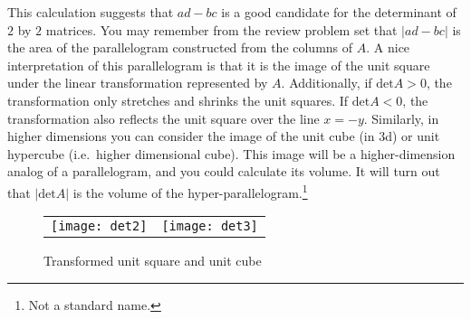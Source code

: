 \documentclass[12pt,reqno]{amsart}
\renewcommand{\det}{\mathrm{det}}
\theoremstyle{definition}
\begin{document}
This calculation suggests that $ad - bc $ is a good candidate for the
determinant of $2$ by $2$ matrices. You may remember from the review
problem set that $|ad-bc|$ is the area of the parallelogram
constructed from the columns of $A$. A nice interpretation of this
parallelogram is that it is the image of the unit square under the
linear transformation represented by $A$. Additionally, if $\det A >
0$, the transformation only stretches and shrinks the unit squares. If
$\det A<0$, the transformation also reflects the unit square over the
line $x = -y$. Similarly, in higher dimensions you can consider the
image of the unit cube (in 3d) or unit hypercube (i.e.\ higher
dimensional cube). This image will be a higher-dimension analog of a
parallelogram, and you could calculate its volume. It will turn out
that $|\det A|$ is the volume of the hyper-parallelogram.\footnote{Not
  a standard name.}
\begin{figure} \caption{Transformed unit square and unit cube}
  \begin{tabular}{cc}
    \texttt{[image: det2]} &
    \texttt{[image: det3]} 
  \end{tabular}
\end{figure}
\end{document}

